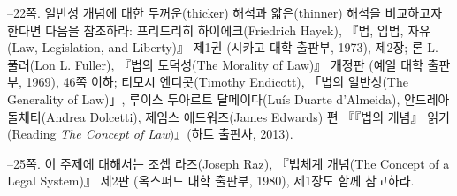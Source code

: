 {--22쪽.  일반성 개념에 대한
두꺼운(thicker) 해석과 얇은(thinner) 해석을 비교하고자 한다면 다음을
참조하라: 프리드리히 하이에크(Friedrich Hayek), 『법, 입법, 자유(Law,
Legislation, and Liberty)』 제1권 (시카고 대학 출판부, 1973), 제2장; 론
L. 풀러(Lon L. Fuller), 『법의 도덕성(The Morality of Law)』 개정판
(예일 대학 출판부, 1969), 46쪽 이하; 티모시 엔디콧(Timothy Endicott),
「법의 일반성(The Generality of Law)」, 루이스 두아르트 달메이다(Luís
Duarte d'Almeida), 안드레아 돌체티(Andrea Dolcetti), 제임스
에드워즈(James Edwards) 편 『『법의 개념』 읽기(Reading \emph{The
Concept of Law})』(하트 출판사, 2013).

--25쪽.  이 주제에
대해서는 조셉 라즈(Joseph Raz), 『법체계 개념(The Concept of a Legal
System)』 제2판 (옥스퍼드 대학 출판부, 1980), 제1장도 함께 참고하라.
}
